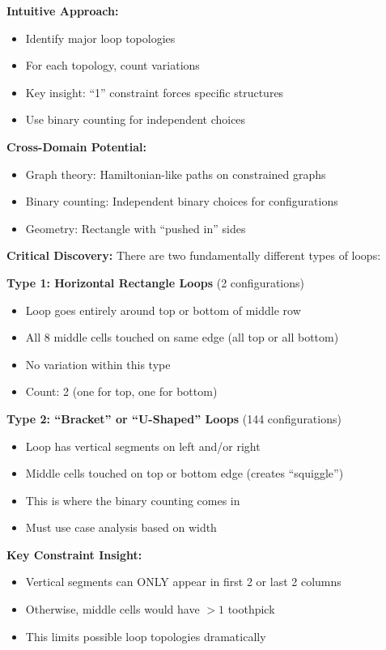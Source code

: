 \documentclass[12pt]{article}
\begin{document}
\begin{problemconfigbox}
\textbf{Intuitive Approach:} 
\begin{itemize}
    \item Identify major loop topologies
    \item For each topology, count variations
    \item Key insight: ``1'' constraint forces specific structures
    \item Use binary counting for independent choices
\end{itemize}

\textbf{Cross-Domain Potential:}
\begin{itemize}
    \item Graph theory: Hamiltonian-like paths on constrained graphs
    \item Binary counting: Independent binary choices for configurations
    \item Geometry: Rectangle with ``pushed in'' sides
\end{itemize}

\end{problemconfigbox}

\begin{keyinsight}
\textbf{Critical Discovery:} There are two fundamentally different types of loops:

\textbf{Type 1: Horizontal Rectangle Loops} (2 configurations)
\begin{itemize}
    \item Loop goes entirely around top or bottom of middle row
    \item All 8 middle cells touched on same edge (all top or all bottom)
    \item No variation within this type
    \item Count: 2 (one for top, one for bottom)
\end{itemize}

\textbf{Type 2: ``Bracket'' or ``U-Shaped'' Loops} (144 configurations)
\begin{itemize}
    \item Loop has vertical segments on left and/or right
    \item Middle cells touched on top or bottom edge (creates ``squiggle'')
    \item This is where the binary counting comes in
    \item Must use case analysis based on width
\end{itemize}

\textbf{Key Constraint Insight:}
\begin{itemize}
    \item Vertical segments can ONLY appear in first 2 or last 2 columns
    \item Otherwise, middle cells would have $>1$ toothpick
    \item This limits possible loop topologies dramatically
\end{itemize}
\end{keyinsight}
\end{document}
